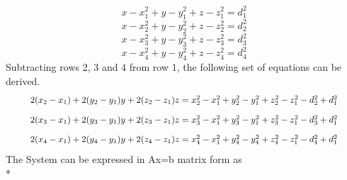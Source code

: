 \documentclass[conference]{IEEEtran}
\begin{document}
\begin{equation}
x-x_1^2 + y-y_1^2 + z-z_1^2 =d_1^2
\end{equation}
\begin{equation}
 x-x_2^2 + y-y_2^2 + z-z_2^2 =d_2^2 
\end{equation}
\begin{equation}
 x-x_3^2 + y-y_3^2 + z-z_3^2 =d_3^2 
\end{equation}
\begin{equation}
 x-x_4^2 + y-y_4^2 + z-z_4^2=d_4^2 
 \end{equation}
 \newline Subtracting rows 2, 3 and 4 from row 1, the following set of equations can be derived.
\begin{equation}
\resizebox{0.9\hsize}{!}{$2(x_2 - x_1) + 2(y_2 - y_1)y + 2 (z_2 - z_1)z = x_2^2 - x_1^2  + y_2^2 - y_1^2 + z_2^2 - z_1^2 - d_2^2 +d_1^2$}
\end{equation}
\begin{equation}
\resizebox{0.9\hsize}{!}{$2(x_3 - x_1) + 2(y_3 - y_1)y + 2 (z_3 - z_1)z = x_3^2 - x_1^2 + y_3^2 - y_1^2 + z_3^2 - z_1^2 - d_3^2 +d_1^2$}
\end{equation}
\begin{equation}
\resizebox{0.9\hsize}{!}{$2(x_4 - x_1) + 2(y_4 - y_1)y + 2 (z_4 - z_1)z = x_4^2 - x_1^2 + y_4^2 - y_4^2 + z_4^2 - z_1^2 - d_4^2 +d_1^2$}
\end{equation}
The System can be expressed in Ax=b matrix form as
 \newline
 \\* 
 
\end{document}
